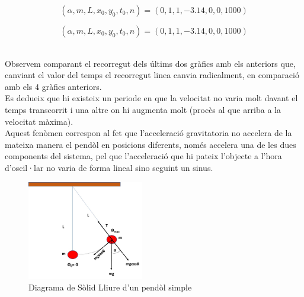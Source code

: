 \documentclass[a4paper, 11pt]{article}
\begin{document}
\begin{itemize}
\begin{figure}[h]
\begin{subfigure}
    $$(\alpha, m, L, x_0, y_0, t_0, n)  = (0, 1, 1, -3.14, 0, 0, 1000)$$
\end{subfigure}
\end{figure}
\newpage
\begin{figure}[h]
\begin{subfigure}
 \centering
    $$(\alpha, m, L, x_0, y_0, t_0, n)  = (0, 1, 1, -3.14, 0, 0, 1000)$$
\end{subfigure}
\end{figure}\\
Observem comparant el recorregut dels últims dos gràfics amb els anteriors que, canviant el valor del temps el recorregut linea canvia radicalment, en comparació amb els 4 gràfics anteriors.\\
Es dedueix que hi existeix un periode en que la velocitat no varia molt davant el temps transcorrit i una altre on hi augmenta molt (procès al que arriba a la velocitat màxima).\\
Aquest fenòmen correspon al fet que l'acceleració gravitatoria no accelera de la mateixa manera el pendòl en posicions diferents, només accelera una de les dues components del sistema, pel que l'acceleració que hi pateix l'objecte a l'hora d'oscil·lar no varia de forma lineal sino seguint un sinus.
\begin{figure}[h]
    \centering
    \includegraphics[width = 0.45\textwidth]{pendulo.png}
    \caption{Diagrama de Sòlid Lliure d'un pendòl simple}
    \label{fig:my_label}
\end{figure}


\end{itemize}
\end{document}
